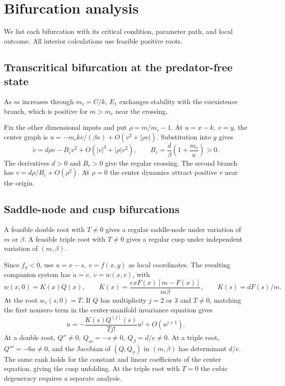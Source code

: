 \section{Bifurcation analysis}\label{sec:bif}
We list each bifurcation with its critical condition, parameter path, and local outcome. All interior calculations use feasible positive roots.

\subsection{Transcritical bifurcation at the predator-free state}
\begin{theorem}\label{thm:tc}
As \(m\) increases through \(m_c=C/k\), \(E_1\) exchanges stability with the coexistence branch, which is positive for \(m>m_c\) near the crossing.
\end{theorem}
Fix the other dimensional inputs and put \(\rho=m/m_c-1\). At \(u=x-k,\ v=y\), the center graph is \(u=-m_c k v/(\beta\kappa)+O(v^2+|\rho v|)\). Substitution into \(g\) gives
\[
 \dot v=d\rho v-B_cv^2+O(|v|^3+|\rho|v^2),\qquad
 B_c=\frac{d}{\beta}\left(1+\frac{m_c}{\kappa}\right)>0 .
\]
The derivatives \(d>0\) and \(B_c>0\) give the regular crossing. The second branch has \(v=d\rho/B_c+O(\rho^2)\). At \(\rho=0\) the center dynamics attract positive \(v\) near the origin.

\subsection{Saddle-node and cusp bifurcations}\label{sec:comp}
\begin{theorem}\label{thm:fold}
A feasible double root with \(T\ne0\) gives a regular saddle-node under variation of \(m\) or \(\beta\). A feasible triple root with \(T\ne0\) gives a regular cusp under independent variation of \((m,\beta)\).
\end{theorem}
Since \(f_y<0\), use \(u=x-s,\ v=f(x,y)\) as local coordinates. The resulting companion system has \(\dot u=v,\ \dot v=w(x,v)\), with
\[
 w(x,0)=K(x)Q(x),\qquad K(x)=\frac{exF(x)[m-F(x)]}{m\beta},\qquad K(s)=dF(s)/m.
\]
At the root \(w_v(s,0)=T\). If \(Q\) has multiplicity \(j=2\) or \(3\) and \(T\ne0\), matching the first nonzero term in the center-manifold invariance equation gives
\begin{equation}\label{eq:center}
 \dot u=-\frac{K(s)Q^{(j)}(s)}{Tj!}u^j+O(u^{j+1}).
\end{equation}
At a double root, \(Q''\ne0,\ Q_m=-s\ne0,\ Q_\beta=d/e\ne0\). At a triple root, \(Q'''=-6a\ne0\), and the Jacobian of \((Q,Q_x)\) in \((m,\beta)\) has determinant \(d/e\). The same rank holds for the constant and linear coefficients of the center equation, giving the cusp unfolding. At the triple root with \(T=0\) the cubic degeneracy requires a separate analysis.

